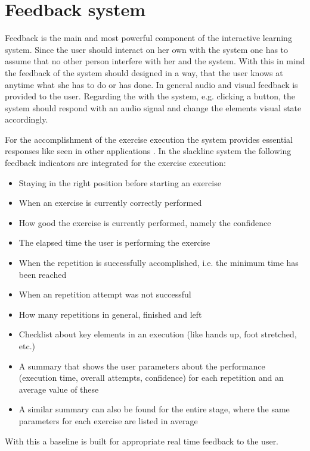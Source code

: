 \section{Feedback system}\label{4_5_feedbackSystem}
Feedback is the main and most powerful component of the interactive learning system. Since the user should interact on her own with the system one has to assume that no other person interfere with her and the system. With this in mind the feedback of the system should designed in a way, that the user knows at anytime what she has to do or has done. In general audio and visual feedback is provided to the user. Regarding the \textbf{} with the system, e.g. clicking a button, the system should respond with an audio signal and change the elements visual state accordingly.

For the accomplishment of the exercise execution the system provides essential responses like seen in other applications \textbf{}. In the slackline system the following feedback indicators are integrated for the exercise execution:
\begin{itemize}
\item Staying in the right position before starting an exercise
\item When an exercise is currently correctly performed
\item How good the exercise is currently performed, namely the confidence
\item The elapsed time the user is performing the exercise
\item When the repetition is successfully accomplished, i.e. the minimum time has been reached
\item When an repetition attempt was not successful
\item How many repetitions in general, finished and left
\item Checklist about key elements in an execution (like hands up, foot stretched, etc.)
\item A summary that shows the user parameters about the performance (execution time, overall attempts, confidence) for each repetition and an average value of these
\item A similar summary can also be found for the entire stage, where the same parameters for each exercise are listed in average
\end{itemize}
With this a baseline is built for appropriate real time feedback to the user.

